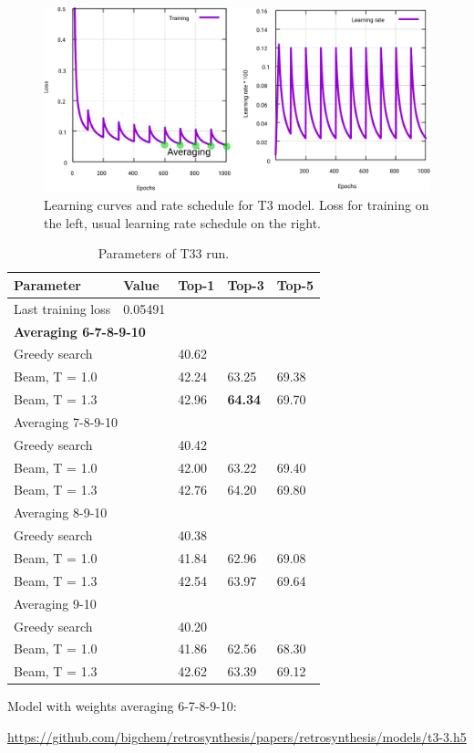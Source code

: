 \documentclass{article}
\begin{document}
\begin{figure}[h!]
  \centering
  \includegraphics[width = 16.5cm]{images/t3-3.pdf}
  \caption{Learning curves and rate schedule for T3 model. Loss for training on the left, usual learning rate schedule on the right.}
  \label{fig:t11}
\end{figure}

\begin{table}[h!]
\caption{Parameters of T33 run.}
  \centering
  \begin{tabular}{p{8.2cm}p{1.5cm}p{1.5cm}p{1.5cm}p{1.5cm}}
    \toprule
    Parameter & Value & Top-1 & Top-3 & Top-5 \\
    \midrule
    Last training loss & 0.05491 & & & \\
    \midrule
    \multicolumn{5}{l}{\textbf{Averaging 6-7-8-9-10}} \\ \midrule
    Greedy search  & & 40.62 & & \\
    Beam, T = 1.0  & & 42.24 & 63.25 & 69.38  \\
    Beam, T = 1.3 & & 42.96 & \textbf{64.34} & 69.70 \\ 
    \midrule
    \multicolumn{5}{l}{Averaging 7-8-9-10} \\ \midrule
    Greedy search  & & 40.42 & & \\
    Beam, T = 1.0  & & 42.00 & 63.22 & 69.40  \\
    Beam, T = 1.3 & & 42.76 & 64.20 & 69.80 \\ \midrule
    \multicolumn{5}{l}{Averaging 8-9-10} \\ \midrule
    Greedy search  & & 40.38 & & \\
    Beam, T = 1.0  & & 41.84 & 62.96 & 69.08  \\
    Beam, T = 1.3 & & 42.54 & 63.97 & 69.64 \\ \midrule
    \multicolumn{5}{l}{Averaging 9-10} \\ \midrule
    Greedy search  & & 40.20 & & \\
    Beam, T = 1.0  & & 41.86 & 62.56 & 68.30  \\
    Beam, T = 1.3 & & 42.62 & 63.39 & 69.12 \\ 
    \bottomrule
  \end{tabular}
  \label{tbl:t33}
\end{table} 

Model with weights averaging 6-7-8-9-10:

\url{https://github.com/bigchem/retrosynthesis/papers/retrosynthesis/models/t3-3.h5}
\end{document}
